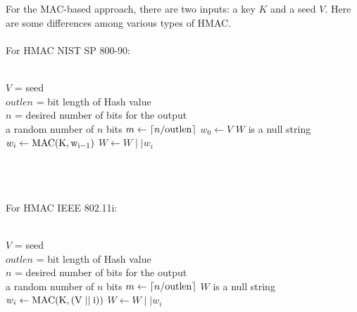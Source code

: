 \documentclass[12pt,a4paper,oneside]{report}
\begin{document}
For the MAC-based approach, there are two inputs: a key $K$ and a seed $V$. Here are some differences among various types of HMAC.\\ \\
For HMAC NIST SP 800-90:
\begin{algorithm}
    \begin{algorithmic}
        \Require \\
        $V$ = seed\\
        $outlen$ = bit length of Hash value\\
        $n$ = desired number of bits for the output
        \Ensure \\
        a random number of $n$ bits
                \State $m \gets \lceil n/\rm{outlen} \rceil$ 
                \State $w_0 \gets V$ 
                \State $W$ is a null string
                    \State $w_i \gets \rm{MAC}(K,w_{i-1})$  
                    \State $W \gets W \mid\mid w_i$  
                \EndFor
                \State {}  
        \EndFunction  
    \end{algorithmic}  
\end{algorithm}
\\
\\
\\
For HMAC IEEE 802.11i:
\begin{algorithm}
    \begin{algorithmic}
        \Require \\
        $V$ = seed\\
        $outlen$ = bit length of Hash value\\
        $n$ = desired number of bits for the output
        \Ensure \\
        a random number of $n$ bits
                \State $m \gets \lceil n/\rm{outlen} \rceil$ 
                \State $W$ is a null string
                    \State $w_i \gets \rm{MAC}(K,(V\mid \mid i))$  
                    \State $W \gets W \mid\mid w_i$  
                \EndFor
                \State {}  
        \EndFunction  
    \end{algorithmic}  
\end{algorithm}
\\
\\
\\
\end{document}
